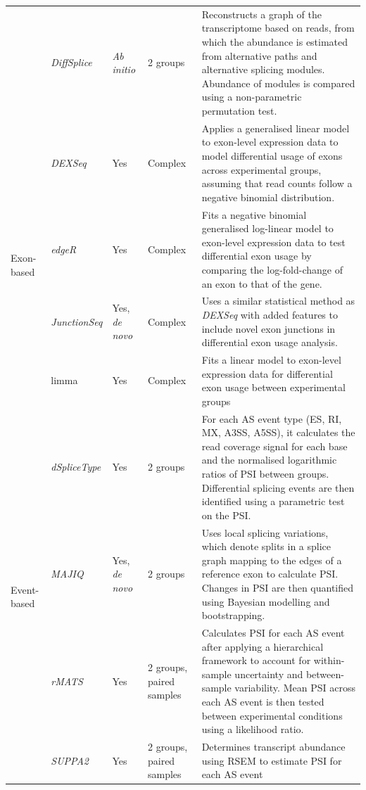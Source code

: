 \begin{landscape}
\begin{longtable}[c]{p{2.5cm}p{2cm}p{2cm}p{1.5cm}p{17.5cm}}
	&
	\textit{DiffSplice} &
	\textit{Ab initio} &
	2 groups &
	\tabitem Reconstructs a graph of the transcriptome based on reads, from which the abundance is estimated from alternative paths and alternative splicing modules.\newline 
	\tabitem  Abundance of modules is compared using a non-parametric permutation test. \\ \cmidrule(l){1-5} 
	\multirow{4}{*}{Exon-based} &
	\textit{DEXSeq} &
	Yes &
	Complex &
	\tabitem Applies a generalised linear model to exon-level expression data to model differential usage of exons across experimental groups, assuming that read counts follow a negative binomial distribution. \\ 		
	&
	\textit{edgeR} &
	Yes &
	Complex &
	\tabitem Fits a negative binomial generalised log-linear model to exon-level expression data to test differential exon usage by comparing the log-fold-change of an exon to that of the gene. \\
	&
	\textit{JunctionSeq} &
	Yes, \textit{de novo} &
	Complex &
	\tabitem Uses a similar statistical method as \textit{DEXSeq} with added features to include novel exon junctions in differential exon usage analysis. \\	
	&
	limma &
	Yes &
	Complex &
	\tabitem Fits a linear model to exon-level expression data for differential exon usage between experimental groups \\ \cmidrule(l){1-5} 
	\multirow{4}{*}{Event-based} &
	\textit{dSpliceType} &
	Yes &
	2 groups &
	\tabitem For each AS event type (ES, RI, MX, A3SS, A5SS), it calculates the read coverage signal for each base and the normalised logarithmic ratios of PSI between groups. Differential splicing events are then identified using a parametric test on the PSI. \\ 			
	& 
	\textit{MAJIQ} &
	Yes, \textit{de novo} &
	2 groups &
	\tabitem Uses local splicing variations, which denote splits in a splice graph mapping to the edges of a reference exon to calculate PSI.   
	\tabitem Changes in PSI are then quantified using Bayesian modelling and bootstrapping. \\ 		

	&
	\textit{rMATS} &
	Yes &
	2 groups, \newline paired samples &
	\tabitem Calculates PSI for each AS event after applying a hierarchical framework to account for within-sample uncertainty and between-sample variability.
	\tabitem Mean PSI across each AS event is then tested between experimental conditions using a likelihood ratio. \\ 	
	&
	\textit{SUPPA2} &
	Yes &
	2 groups, \newline paired samples &
	\tabitem Determines transcript abundance using RSEM to estimate PSI   for each AS event \\* \bottomrule 
	\end{longtable}
\end{landscape}
\restoregeometry

